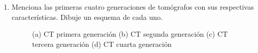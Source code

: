 \newlength{\strutheight}
\settoheight{\strutheight}{\strut}


\begin{enumerate}[1.]
\item  Menciona las primeras cuatro generaciones de tomógrafos con sus respectivas características. Dibuje un esquema de cada uno.


        \begin{figure}[!ht]
          \centering
          \caption{(a) CT primera generación (b) CT segunda generación (c) CT tercera generación (d) CT cuarta generación}
          \label{fig:CT}
      \end{figure}
     

\end{enumerate}
